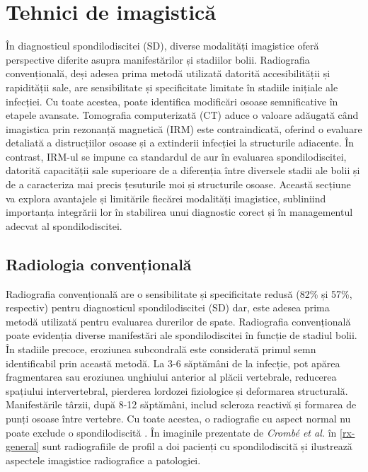 \message{ !name(LaMain.tex)}\documentclass[romanian,12pt,a4paper]{article}
\begin{document}
\section{Tehnici de imagistică}

În diagnosticul spondilodiscitei (SD), diverse modalități imagistice
oferă perspective diferite asupra manifestărilor și stadiilor bolii.
Radiografia convențională, deși adesea prima metodă utilizată datorită
accesibilității și rapidității sale, are sensibilitate și specificitate
limitate în stadiile inițiale ale infecției. Cu toate acestea, poate
identifica modificări osoase semnificative în etapele avansate.
Tomografia computerizată (CT) aduce o valoare adăugată când imagistica
prin rezonanță magnetică (IRM) este contraindicată, oferind o evaluare
detaliată a distrucțiilor osoase și a extinderii infecției la
structurile adiacente. În contrast, IRM-ul se impune ca standardul de
aur în evaluarea spondilodiscitei, datorită capacității sale superioare
de a diferenția între diversele stadii ale bolii și de a caracteriza mai
precis țesuturile moi și structurile osoase. Această secțiune va explora
avantajele și limitările fiecărei modalități imagistice, subliniind
importanța integrării lor în stabilirea unui diagnostic corect și în
managementul adecvat al spondilodiscitei.

\subsection{Radiologia convențională}

Radiografia convențională are o sensibilitate și specificitate redusă
(82\% și 57\%, respectiv) pentru diagnosticul spondilodiscitei (SD) dar,
este adesea prima metodă utilizată pentru evaluarea durerilor de spate.
Radiografia convențională poate evidenția diverse manifestări ale
spondilodiscitei în funcție de stadiul bolii. În stadiile precoce,
eroziunea subcondrală este considerată primul semn identificabil prin
această metodă. La 3-6 săptămâni de la infecție, pot apărea fragmentarea
sau eroziunea unghiului anterior al plăcii vertebrale, reducerea
spațiului intervertebral, pierderea lordozei fiziologice și deformarea
structurală. Manifestările târzii, după 8-12 săptămâni, includ scleroza
reactivă și formarea de punți osoase între vertebre. Cu toate acestea, o
radiografie cu aspect normal nu poate exclude o spondilodiscită
\cite{SpondylodiscitisDiagnosisTreatment2017}. În imaginile prezentate de
\emph{Crombé et al.} în \ref{rx-general} sunt
radiografiile de profil a doi pacienți cu spondilodiscită și ilustrează
aspectele imagistice radiografice a patologiei.
\end{document}
